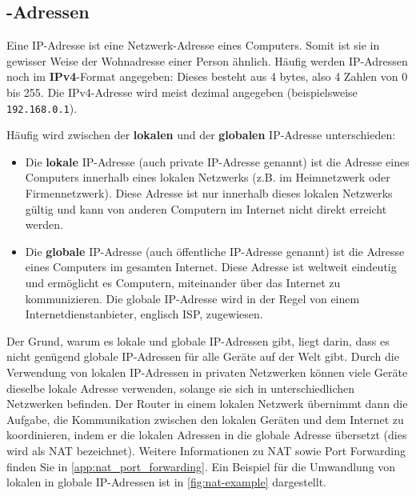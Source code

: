 \subsection{\texorpdfstring{-Adressen}{IP-Adressen}}

Eine \acrfull{IP}-Adresse ist eine Netzwerk-Adresse eines Computers. Somit ist sie in gewisser Weise der Wohnadresse einer Person ähnlich. Häufig werden \gls{IP}-Adressen noch im \textbf{IPv4}-Format angegeben: Dieses besteht aus 4 bytes, also 4 Zahlen von 0 bis 255. Die \gls{IP}v4-Adresse wird meist dezimal angegeben (beispielsweise \texttt{192.168.0.1}).

Häufig wird zwischen der \textbf{lokalen} und der \textbf{globalen} \gls{IP}-Adresse unterschieden:
\begin{itemize}
	\item Die \textbf{lokale} \gls{IP}-Adresse (auch private \gls{IP}-Adresse genannt) ist die Adresse eines Computers innerhalb eines lokalen Netzwerks (z.B. im Heimnetzwerk oder Firmennetzwerk). Diese Adresse ist nur innerhalb dieses lokalen Netzwerks gültig und kann von anderen Computern im Internet nicht direkt erreicht werden.
	\item Die \textbf{globale} \gls{IP}-Adresse (auch öffentliche \gls{IP}-Adresse genannt) ist die Adresse eines Computers im gesamten Internet. Diese Adresse ist weltweit eindeutig und ermöglicht es Computern, miteinander über das Internet zu kommunizieren. Die globale \gls{IP}-Adresse wird in der Regel von einem Internetdienstanbieter, englisch \gls{ISP}, zugewiesen.
\end{itemize}

Der Grund, warum es lokale und globale \gls{IP}-Adressen gibt, liegt darin, dass es nicht genügend globale \gls{IP}-Adressen für alle Geräte auf der Welt gibt. Durch die Verwendung von lokalen \gls{IP}-Adressen in privaten Netzwerken können viele Geräte dieselbe lokale Adresse verwenden, solange sie sich in unterschiedlichen Netzwerken befinden. Der Router in einem lokalen Netzwerk übernimmt dann die Aufgabe, die Kommunikation zwischen den lokalen Geräten und dem Internet zu koordinieren, indem er die lokalen Adressen in die globale Adresse übersetzt (dies wird als \gls{NAT} bezeichnet). Weitere Informationen zu \gls{NAT} sowie Port Forwarding finden Sie in \cref{app:nat_port_forwarding}. Ein Beispiel für die Umwandlung von lokalen in globale \gls{IP}-Adressen ist in \cref{fig:nat-example} dargestellt.

